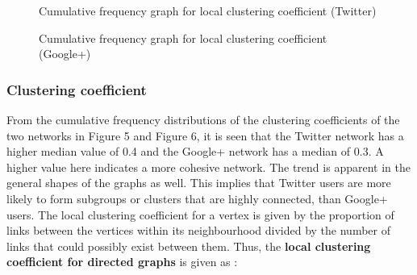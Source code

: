 \documentclass[a4paper, 10pt, conference]{ieeeconf}      %
\begin{document}
\begin{figure}[thpb]
      \centering
      \caption{Cumulative frequency graph for local clustering coefficient (Twitter)}
      \label{figurelabel}
   \end{figure}
   
\begin{figure}[thpb]
      \centering
      \caption{Cumulative frequency graph for local clustering coefficient (Google+)}
      \label{figurelabel}
   \end{figure}

\subsubsection{Clustering coefficient}
From the cumulative frequency distributions of the clustering coefficients of the two networks in Figure 5 and Figure 6, it is seen that the Twitter network has a higher median value of 0.4 and the Google+ network has a median of 0.3. A higher value here indicates a more cohesive network. The trend is apparent in the general shapes of the graphs as well. This implies that Twitter users are more likely to form subgroups or clusters that are highly connected, than Google+ users.
The local clustering coefficient for a vertex is given by the proportion of links between the vertices within its neighbourhood divided by the number of links that could possibly exist between them. 
Thus, the \textbf{local clustering coefficient for directed graphs} is given as \cite{c14}:
\end{document}
